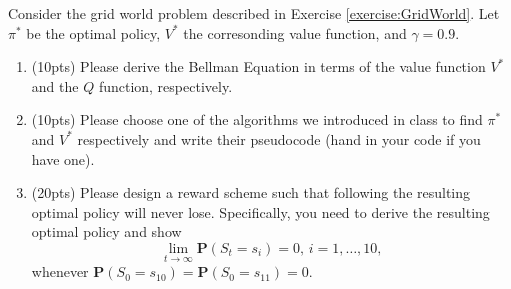 \documentclass[11pt,letter,notitlepage]{article}
\begin{document}
\newpage
\begin{exercise}
	Consider the grid world problem described in Exercise \ref{exercise:GridWorld}. Let $\pi^*$ be the optimal policy, $V^*$ the corresonding value function, and $\gamma=0.9$.

	\begin{enumerate}
		\item (10pts) Please derive the Bellman Equation in terms of the value function $V^*$ and the $Q$ function, respectively.

		\item (10pts) Please choose one of the algorithms we introduced in class to find $\pi^*$ and $V^*$ respectively and write their pseudocode (hand in your code if you have one).

		\item (20pts) Please design a reward scheme such that following the resulting optimal policy will never lose. Specifically, you need to derive the resulting optimal policy and show  $$\lim_{t\rightarrow\infty}\mathbf{P}(S_t=s_i)=0,\,i=1,\ldots,10,$$
		      whenever $\mathbf{P}(S_0=s_{10})=\mathbf{P}(S_0=s_{11})=0$.
	\end{enumerate}


\end{exercise}
\end{document}
